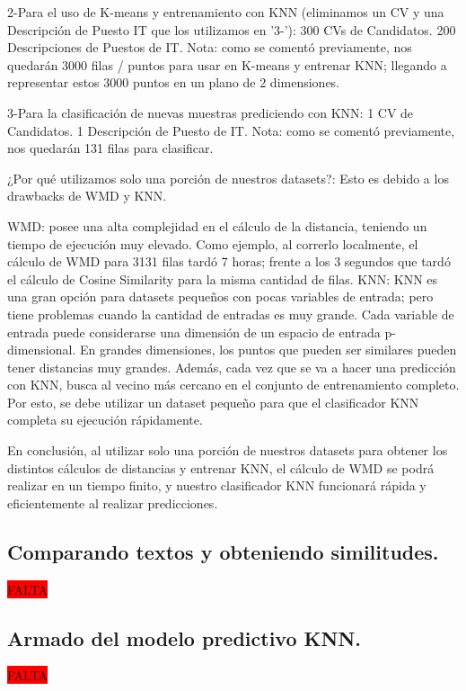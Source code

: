 \documentclass[12pt,a4paper]{article}
\begin{document}
    2-Para el uso de K-means y entrenamiento con KNN (eliminamos un CV y una Descripción de Puesto IT que los utilizamos en '3-'):
        300 CVs de Candidatos.
        200 Descripciones de Puestos de IT.
        Nota: como se comentó previamente, nos quedarán 3000 filas / puntos para usar en K-means y entrenar KNN; llegando a representar estos 3000 puntos en un plano de 2 dimensiones.

    3-Para la clasificación de nuevas muestras prediciendo con KNN:
        1 CV de Candidatos.
        1 Descripción de Puesto de IT.
        Nota: como se comentó previamente, nos quedarán 131 filas para clasificar.

¿Por qué utilizamos solo una porción de nuestros datasets?: Esto es debido a los drawbacks de WMD y KNN.

    WMD: posee una alta complejidad en el cálculo de la distancia, teniendo un tiempo de ejecución muy elevado. Como ejemplo, al correrlo localmente, el cálculo de WMD para 3131 filas tardó 7 horas; frente a los 3 segundos que tardó el cálculo de Cosine Similarity para la misma cantidad de filas.
    KNN: KNN es una gran opción para datasets pequeños con pocas variables de entrada; pero tiene problemas cuando la cantidad de entradas es muy grande. Cada variable de entrada puede considerarse una dimensión de un espacio de entrada p-dimensional. En grandes dimensiones, los puntos que pueden ser similares pueden tener distancias muy grandes. Además, cada vez que se va a hacer una predicción con KNN, busca al vecino más cercano en el conjunto de entrenamiento completo. Por esto, se debe utilizar un dataset pequeño para que el clasificador KNN completa su ejecución rápidamente.

En conclusión, al utilizar solo una porción de nuestros datasets para obtener los distintos cálculos de distancias y entrenar KNN, el cálculo de WMD se podrá realizar en un tiempo finito, y nuestro clasificador KNN funcionará rápida y eficientemente al realizar predicciones.

\subsection{Comparando textos y obteniendo similitudes.}
\colorbox{red}{FALTA}

\subsection{Armado del modelo predictivo KNN.}
\colorbox{red}{FALTA}
\end{document}
